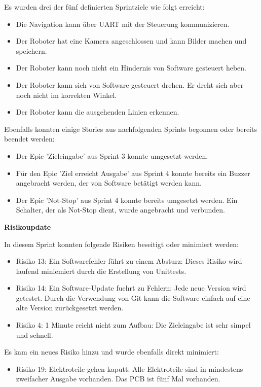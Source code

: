 Es wurden drei der fünf definierten Sprintziele wie folgt erreicht:
\begin{itemize}
    \item Die Navigation kann über UART mit der Steuerung kommunizieren.
    \item Der Roboter hat eine Kamera angeschlossen und kann Bilder machen und speichern.
    \item Der Roboter kann noch nicht ein Hindernis von Software gesteuert heben.
    \item Der Roboter kann sich von Software gesteuert drehen. Er dreht sich aber noch nicht im korrekten Winkel.
    \item Der Roboter kann die ausgehenden Linien erkennen.
\end{itemize}

Ebenfalls konnten einige Stories aus nachfolgenden Sprints begonnen oder bereits beendet werden:
\begin{itemize}
    \item Der Epic 'Zieleingabe' aus Sprint 3 konnte umgesetzt werden.
    \item Für den Epic 'Ziel erreicht Ausgabe' aus Sprint 4 konnte bereits ein Buzzer angebracht werden, der von Software betätigt werden kann.
    \item Der Epic 'Not-Stop' aus Sprint 4 konnte bereits umgesetzt werden. Ein Schalter, der als Not-Stop dient, wurde angebracht und verbunden.
\end{itemize}


\textbf{Risikoupdate}
\label{risks-sprint-2}

In diesem Sprint konnten folgende Risiken beseitigt oder minimiert werden:
\begin{itemize}
    \item Risiko 13: Ein Softwarefehler führt zu einem Absturz: Dieses Risiko wird laufend miniemiert durch die Erstellung von Unittests.
    \item Risiko 14: Ein Software-Update fuehrt zu Fehlern: Jede neue Version wird getestet. Durch die Verwendung von Git kann die Software einfach auf eine alte Version zurückgesetzt werden.
    \item Risiko 4: 1 Minute reicht nicht zum Aufbau: Die Zieleingabe ist sehr simpel und schnell.
\end{itemize}

Es kam ein neues Risiko hinzu und wurde ebenfalls direkt minimiert:
\begin{itemize}
    \item Risiko 19: Elektroteile gehen kaputt: Alle Elektroteile sind in mindestens zweifacher Ausgabe vorhanden. Das PCB ist fünf Mal vorhanden.
\end{itemize}
\newpage

